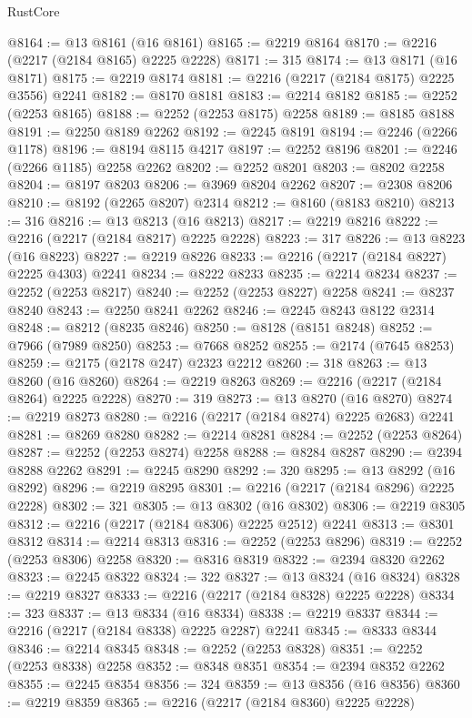 \begin{lexlean}{RustCore}
\begin{coremodule}
@8164 := @13 @8161 (@16 @8161)
@8165 := @2219 @8164
@8170 := @2216 (@2217 (@2184 @8165) @2225 @2228)
@8171 := 315
@8174 := @13 @8171 (@16 @8171)
@8175 := @2219 @8174
@8181 := @2216 (@2217 (@2184 @8175) @2225 @3556) @2241
@8182 := @8170 @8181
@8183 := @2214 @8182
@8185 := @2252 (@2253 @8165)
@8188 := @2252 (@2253 @8175) @2258
@8189 := @8185 @8188
@8191 := @2250 @8189 @2262
@8192 := @2245 @8191
@8194 := @2246 (@2266 @1178)
@8196 := @8194 @8115 @4217
@8197 := @2252 @8196
@8201 := @2246 (@2266 @1185) @2258 @2262
@8202 := @2252 @8201
@8203 := @8202 @2258
@8204 := @8197 @8203
@8206 := @3969 @8204 @2262
@8207 := @2308 @8206
@8210 := @8192 (@2265 @8207) @2314
@8212 := @8160 (@8183 @8210)
@8213 := 316
@8216 := @13 @8213 (@16 @8213)
@8217 := @2219 @8216
@8222 := @2216 (@2217 (@2184 @8217) @2225 @2228)
@8223 := 317
@8226 := @13 @8223 (@16 @8223)
@8227 := @2219 @8226
@8233 := @2216 (@2217 (@2184 @8227) @2225 @4303) @2241
@8234 := @8222 @8233
@8235 := @2214 @8234
@8237 := @2252 (@2253 @8217)
@8240 := @2252 (@2253 @8227) @2258
@8241 := @8237 @8240
@8243 := @2250 @8241 @2262
@8246 := @2245 @8243 @8122 @2314
@8248 := @8212 (@8235 @8246)
@8250 := @8128 (@8151 @8248)
@8252 := @7966 (@7989 @8250)
@8253 := @7668 @8252
@8255 := @2174 (@7645 @8253)
@8259 := @2175 (@2178 @247) @2323 @2212
@8260 := 318
@8263 := @13 @8260 (@16 @8260)
@8264 := @2219 @8263
@8269 := @2216 (@2217 (@2184 @8264) @2225 @2228)
@8270 := 319
@8273 := @13 @8270 (@16 @8270)
@8274 := @2219 @8273
@8280 := @2216 (@2217 (@2184 @8274) @2225 @2683) @2241
@8281 := @8269 @8280
@8282 := @2214 @8281
@8284 := @2252 (@2253 @8264)
@8287 := @2252 (@2253 @8274) @2258
@8288 := @8284 @8287
@8290 := @2394 @8288 @2262
@8291 := @2245 @8290
@8292 := 320
@8295 := @13 @8292 (@16 @8292)
@8296 := @2219 @8295
@8301 := @2216 (@2217 (@2184 @8296) @2225 @2228)
@8302 := 321
@8305 := @13 @8302 (@16 @8302)
@8306 := @2219 @8305
@8312 := @2216 (@2217 (@2184 @8306) @2225 @2512) @2241
@8313 := @8301 @8312
@8314 := @2214 @8313
@8316 := @2252 (@2253 @8296)
@8319 := @2252 (@2253 @8306) @2258
@8320 := @8316 @8319
@8322 := @2394 @8320 @2262
@8323 := @2245 @8322
@8324 := 322
@8327 := @13 @8324 (@16 @8324)
@8328 := @2219 @8327
@8333 := @2216 (@2217 (@2184 @8328) @2225 @2228)
@8334 := 323
@8337 := @13 @8334 (@16 @8334)
@8338 := @2219 @8337
@8344 := @2216 (@2217 (@2184 @8338) @2225 @2287) @2241
@8345 := @8333 @8344
@8346 := @2214 @8345
@8348 := @2252 (@2253 @8328)
@8351 := @2252 (@2253 @8338) @2258
@8352 := @8348 @8351
@8354 := @2394 @8352 @2262
@8355 := @2245 @8354
@8356 := 324
@8359 := @13 @8356 (@16 @8356)
@8360 := @2219 @8359
@8365 := @2216 (@2217 (@2184 @8360) @2225 @2228)

\end{coremodule}
\end{lexlean}
